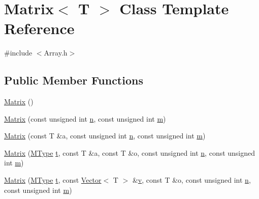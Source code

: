 \hypertarget{classMatrix}{}\section{Matrix$<$ T $>$ Class Template Reference}
\label{classMatrix}


{\ttfamily \#include $<$Array.\+h$>$}

\subsection*{Public Member Functions}
\begin{DoxyCompactItemize}
\item 
\mbox{\hyperlink{classMatrix_a9d567e3a121b1be0c3f9c461cab524fe_a9d567e3a121b1be0c3f9c461cab524fe}{Matrix}} ()
\item 
\mbox{\hyperlink{classMatrix_ac8061527f81abb94e19b1ac6fd4af63a_ac8061527f81abb94e19b1ac6fd4af63a}{Matrix}} (const unsigned int \mbox{\hyperlink{classMatrix_afe2ef09343ff36b98618d696e7b232e3_afe2ef09343ff36b98618d696e7b232e3}{n}}, const unsigned int \mbox{\hyperlink{classMatrix_a0a922a1712cf7e9afb32fd8fff6809df_a0a922a1712cf7e9afb32fd8fff6809df}{m}})
\item 
\mbox{\hyperlink{classMatrix_a697e01f8d46c2059d0420d5b420efb91_a697e01f8d46c2059d0420d5b420efb91}{Matrix}} (const T \&a, const unsigned int \mbox{\hyperlink{classMatrix_afe2ef09343ff36b98618d696e7b232e3_afe2ef09343ff36b98618d696e7b232e3}{n}}, const unsigned int \mbox{\hyperlink{classMatrix_a0a922a1712cf7e9afb32fd8fff6809df_a0a922a1712cf7e9afb32fd8fff6809df}{m}})
\item 
\mbox{\hyperlink{classMatrix_a991881e660607b10ff4fbf705006108d_a991881e660607b10ff4fbf705006108d}{Matrix}} (\mbox{\hyperlink{Array_8h_afb4b79601b9f07458ff37d2c507b3e6d_afb4b79601b9f07458ff37d2c507b3e6d}{M\+Type}} \mbox{\hyperlink{Array_8h_a182b5b431d17bd072b8384e4ad728cf3_a182b5b431d17bd072b8384e4ad728cf3}{t}}, const T \&a, const T \&o, const unsigned int \mbox{\hyperlink{classMatrix_afe2ef09343ff36b98618d696e7b232e3_afe2ef09343ff36b98618d696e7b232e3}{n}}, const unsigned int \mbox{\hyperlink{classMatrix_a0a922a1712cf7e9afb32fd8fff6809df_a0a922a1712cf7e9afb32fd8fff6809df}{m}})
\item 
\mbox{\hyperlink{classMatrix_ab2f0cdfc1e7aac9ddd46a1c6b6a3f2f9_ab2f0cdfc1e7aac9ddd46a1c6b6a3f2f9}{Matrix}} (\mbox{\hyperlink{Array_8h_afb4b79601b9f07458ff37d2c507b3e6d_afb4b79601b9f07458ff37d2c507b3e6d}{M\+Type}} \mbox{\hyperlink{Array_8h_a182b5b431d17bd072b8384e4ad728cf3_a182b5b431d17bd072b8384e4ad728cf3}{t}}, const \mbox{\hyperlink{classVector}{Vector}}$<$ T $>$ \&\mbox{\hyperlink{classMatrix_a0914658ee459304d3dbcc26806038019_a0914658ee459304d3dbcc26806038019}{v}}, const T \&o, const unsigned int \mbox{\hyperlink{classMatrix_afe2ef09343ff36b98618d696e7b232e3_afe2ef09343ff36b98618d696e7b232e3}{n}}, const unsigned int \mbox{\hyperlink{classMatrix_a0a922a1712cf7e9afb32fd8fff6809df_a0a922a1712cf7e9afb32fd8fff6809df}{m}})

\end{DoxyCompactItemize}
